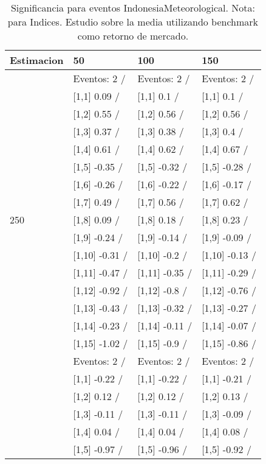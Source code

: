 \begin{table}

\caption{Significancia para eventos IndonesiaMeteorological. Nota: para Indices. Estudio sobre la media utilizando benchmark como retorno de mercado.}
\centering
\begin{tabular}[t]{llll}
\toprule
Estimacion & 50 & 100 & 150\\
\midrule
 & Eventos:  2 / & Eventos:  2 / & Eventos:  2 /\\
 & {}[1,1] 0.09  / & {}[1,1] 0.1  / & {}[1,1] 0.1  /\\
 & {}[1,2] 0.55  / & {}[1,2] 0.56  / & {}[1,2] 0.56  /\\
 & {}[1,3] 0.37  / & {}[1,3] 0.38  / & {}[1,3] 0.4  /\\
 & {}[1,4] 0.61  / & {}[1,4] 0.62  / & {}[1,4] 0.67  /\\
\addlinespace
 & {}[1,5] -0.35  / & {}[1,5] -0.32  / & {}[1,5] -0.28  /\\
 & {}[1,6] -0.26  / & {}[1,6] -0.22  / & {}[1,6] -0.17  /\\
 & {}[1,7] 0.49  / & {}[1,7] 0.56  / & {}[1,7] 0.62  /\\
250 & {}[1,8] 0.09  / & {}[1,8] 0.18  / & {}[1,8] 0.23  /\\
 & {}[1,9] -0.24  / & {}[1,9] -0.14  / & {}[1,9] -0.09  /\\
\addlinespace
 & {}[1,10] -0.31  / & {}[1,10] -0.2  / & {}[1,10] -0.13  /\\
 & {}[1,11] -0.47  / & {}[1,11] -0.35  / & {}[1,11] -0.29  /\\
 & {}[1,12] -0.92  / & {}[1,12] -0.8  / & {}[1,12] -0.76  /\\
 & {}[1,13] -0.43  / & {}[1,13] -0.32  / & {}[1,13] -0.27  /\\
 & {}[1,14] -0.23  / & {}[1,14] -0.11  / & {}[1,14] -0.07  /\\
\addlinespace
 & {}[1,15] -1.02  / & {}[1,15] -0.9  / & {}[1,15] -0.86  /\\
 & Eventos:  2 / & Eventos:  2 / & Eventos:  2 /\\
 & {}[1,1] -0.22  / & {}[1,1] -0.22  / & {}[1,1] -0.21  /\\
 & {}[1,2] 0.12  / & {}[1,2] 0.12  / & {}[1,2] 0.13  /\\
 & {}[1,3] -0.11  / & {}[1,3] -0.11  / & {}[1,3] -0.09  /\\
\addlinespace
 & {}[1,4] 0.04  / & {}[1,4] 0.04  / & {}[1,4] 0.08  /\\
 & {}[1,5] -0.97  / & {}[1,5] -0.96  / & {}[1,5] -0.92  /\\

\end{tabular}
\end{table}

